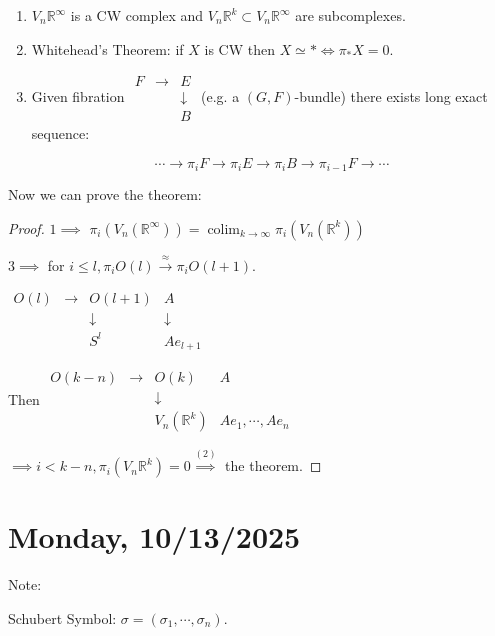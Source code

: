 \documentclass{article}
\theoremstyle{definition}
\begin{document}
    \begin{enumerate}[label=\arabic*)]
        \item \(V_n \mathbb{R}^{\infty}\) is a CW complex and \(V_n \mathbb{R}^k \subset V_n \mathbb{R}^{\infty}\) are subcomplexes.
        \item Whitehead's Theorem: if \(X\) is CW then \(X\simeq \ast \iff \pi_{\ast} X = 0\).
        \item Given fibration \(\begin{matrix} F & \to & E \\ & & \downarrow \\ & & B\end{matrix}\) (e.g. a \((G,F)\)-bundle) there exists long exact sequence:
        
        \[
            \cdots \to \pi_i F \to \pi_i E \to \pi_i B \to \pi_{i-1} F \to \cdots
        \]
    \end{enumerate} 

    Now we can prove the theorem:

    \begin{proof}
        \(1\implies\)  \(\pi_i(V_n(\mathbb{R}^{\infty})) = \operatorname{colim}_{k \to \infty} \pi_i(V_n(\mathbb{R}^k))\)  

        \(3 \implies\) for \(i \leq l, \pi_i O(l) \xrightarrow{\approx} \pi_i O(l+1)\).
        
        \(\begin{matrix}O(l) & \to & O(l+1) & A \\ & & \downarrow & \downarrow \\ & & S^l & A e_{l+1}\end{matrix}\)

        Then \(\begin{matrix}O(k-n) & \to & O(k) & A \\ & & \downarrow \\ & & V_n(\mathbb{R}^k) & A e_1, \cdots , A e_n\end{matrix}\) 

        \(\implies i < k-n, \pi_i (V_n \mathbb{R}^k) = 0 \overset{(2)}{\implies} \) the theorem. 
    \end{proof}

    \section*{Monday, 10/13/2025}
    
    Note:

    Schubert Symbol: \(\sigma = (\sigma_1, \cdots , \sigma_n)\).
\end{document}

